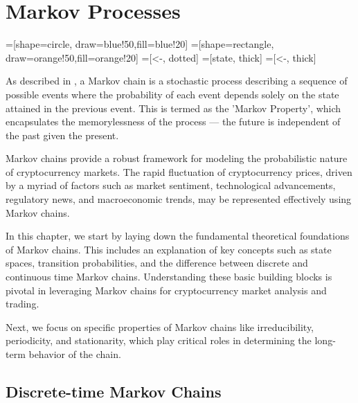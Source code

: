 \chapter{Markov Processes}  %

\ifpdf%
    \graphicspath{{Chapter1/Figs/Raster/}{Chapter1/Figs/PDF/}{Chapter1/Figs/}}
\else
    \graphicspath{{Chapter1/Figs/Vector/}{Chapter1/Figs/}}
\fi

=[shape=circle, draw=blue!50,fill=blue!20]
=[shape=rectangle, draw=orange!50,fill=orange!20]
=[<-, dotted]
=[state, thick]
=[<-, thick]

As described in \citep{Ross2014}, a Markov chain is a stochastic process describing a sequence of possible events where the probability of each event depends solely on the state attained in the previous event. This is termed as the 'Markov Property', which encapsulates the memorylessness of the process — the future is independent of the past given the present.

Markov chains provide a robust framework for modeling the probabilistic nature of cryptocurrency markets. The rapid fluctuation of cryptocurrency prices, driven by a myriad of factors such as market sentiment, technological advancements, regulatory news, and macroeconomic trends, may be represented effectively using Markov chains. \citep{Zhang2023}

In this chapter, we start by laying down the fundamental theoretical foundations of Markov chains. This includes an explanation of key concepts such as state spaces, transition probabilities, and the difference between discrete and continuous time Markov chains. Understanding these basic building blocks is pivotal in leveraging Markov chains for cryptocurrency market analysis and trading.

Next, we focus on specific properties of Markov chains like irreducibility, periodicity, and stationarity, which play critical roles in determining the long-term behavior of the chain.

\section{Discrete-time Markov Chains}

